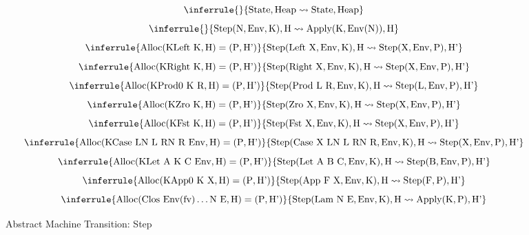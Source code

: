 \documentclass[acmsmall]{acmart}
\begin{document}
	\begin{figure}
		\[
		\inferrule{ }{\text{State}, \text{Heap} \leadsto \text{State}, \text{Heap}}
		\]
		\[
		\inferrule{ }{\text{Step}(\text{N}, \text{Env}, \text{K}), \text{H} \leadsto \text{Apply}(\text{K}, \text{Env}(\text{N})), \text{H}}
		\]
		\[
		\inferrule{\text{Alloc}(\text{KLeft}\ \text{K}, \text{H}) = (\text{P}, \text{H'})}{\text{Step}(\text{Left}\ \text{X}, \text{Env}, \text{K}), \text{H} \leadsto \text{Step}(\text{X}, \text{Env}, \text{P}), \text{H'}}
		\]
		\[
		\inferrule{\text{Alloc}(\text{KRight}\ \text{K}, \text{H}) = (\text{P}, \text{H'})}{\text{Step}(\text{Right}\ \text{X}, \text{Env}, \text{K}), \text{H} \leadsto \text{Step}(\text{X}, \text{Env}, \text{P}), \text{H'}}
		\]
		\[
		\inferrule{\text{Alloc}(\text{KProd0}\ \text{K}\ \text{R}, \text{H}) = (\text{P}, \text{H'})}{\text{Step}(\text{Prod}\ \text{L}\ \text{R}, \text{Env}, \text{K}), \text{H} \leadsto \text{Step}(\text{L}, \text{Env}, \text{P}), \text{H'}}
		\]
		\[
		\inferrule{\text{Alloc}(\text{KZro}\ \text{K}, \text{H}) = (\text{P}, \text{H'})}{\text{Step}(\text{Zro}\ \text{X}, \text{Env}, \text{K}), \text{H} \leadsto \text{Step}(\text{X}, \text{Env}, \text{P}), \text{H'}}
		\]
		\[
		\inferrule{\text{Alloc}(\text{KFst}\ \text{K}, \text{H}) = (\text{P}, \text{H'})}{\text{Step}(\text{Fst}\ \text{X}, \text{Env}, \text{K}), \text{H} \leadsto \text{Step}(\text{X}, \text{Env}, \text{P}), \text{H'}}
		\]
		\[
		\inferrule{\text{Alloc}(\text{KCase}\ \text{LN}\ \text{L}\ \text{RN}\ \text{R}\ \text{Env}, \text{H}) = (\text{P}, \text{H'})}{\text{Step}(\text{Case}\ \text{X}\ \text{LN}\ \text{L}\ \text{RN}\ \text{R}, \text{Env}, \text{K}), \text{H} \leadsto \text{Step}(\text{X}, \text{Env}, \text{P}), \text{H'}}
		\]
		\[
		\inferrule{\text{Alloc}(\text{KLet}\ \text{A}\ \text{K}\ \text{C}\ \text{Env}, \text{H}) = (\text{P}, \text{H'})}{\text{Step}(\text{Let}\ \text{A}\ \text{B}\ \text{C}, \text{Env}, \text{K}), \text{H} \leadsto \text{Step}(\text{B}, \text{Env}, \text{P}), \text{H'}}
		\]
		\[
		\inferrule{\text{Alloc}(\text{KApp0}\ \text{K}\ \text{X}, \text{H}) = (\text{P}, \text{H'})}{\text{Step}(\text{App}\ \text{F}\ \text{X}, \text{Env}, \text{K}), \text{H} \leadsto \text{Step}(\text{F}, \text{P}), \text{H'}}
		\]
		\[
		\inferrule{\text{Alloc}(\text{Clos}\ \text{Env}(\text{fv})\dots \text{N}\ \text{E}, \text{H}) = (\text{P}, \text{H'})}{\text{Step}(\text{Lam}\ \text{N}\ \text{E}, \text{Env}, \text{K}), \text{H} \leadsto \text{Apply}(\text{K}, \text{P}), \text{H'}}
		\]
		\caption{Abstract Machine Transition: Step}
		\end{figure}
\end{document}
